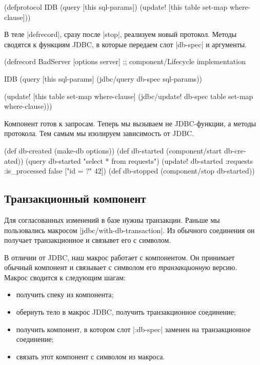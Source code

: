 \begin{english}
  \begin{clojure}
(defprotocol IDB
  (query [this sql-params])
  (update! [this table set-map where-clause]))
  \end{clojure}
\end{english}

В теле \spverb|defrecord|, сразу после \spverb|stop|, реализуем новый
протокол. Методы сводятся к функциям JDBC, в которые передаем слот
\spverb|db-spec| и аргументы.

\begin{english}
  \begin{clojure}
(defrecord BadServer [options server]
  ;; component/Lifecycle implementation

  IDB
  (query [this sql-params]
    (jdbc/query db-spec sql-params))

  (update! [this table set-map where-clause]
    (jdbc/update! db-spec table set-map where-clause)))
  \end{clojure}
\end{english}

Компонент готов к запросам. Теперь мы вызываем не JDBC-функции, а методы
протокола. Тем самым мы изолируем зависимость от JDBC.

\begin{english}
  \begin{clojure}
(def db-created (make-db options))
(def db-started (component/start db-created))
(query db-started "select * from requests")
(update! db-started :requests {:is_processed false} ["id = ?" 42])
(def db-stopped (component/stop db-started))
  \end{clojure}
\end{english}

\subsection{Транзакционный компонент}

Для согласованных изменений в базе нужны транзакции. Раньше мы пользовались
макросом \spverb|jdbc/with-db-transaction|. Из обычного соединения он получает
транзакционное и связывет его с символом.

В отличии от JDBC, наш макрос работает с компонентом. Он принимает обычный
компонент и связывает с символом его \emph{транзакционную} версию. Макрос
сводится к следующим шагам:

\begin{itemize}

\item
  получить спеку из компонента;

\item
  обернуть тело в макрос JDBC, получить транзакционное соединение;

\item
  получить компонент, в котором слот \spverb|:db-spec| заменен на
  транзакционное соединение;

\item
  связать этот компонент с символом из макроса.

\end{itemize}


